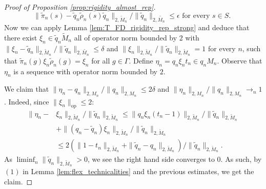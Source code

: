 \documentclass[11pt]{amsart}
\DeclareMathOperator{\op}{op}
\theoremstyle{definition}
\theoremstyle{remark}
\theoremstyle{definition}
\begin{document}
\begin{proof}[Proof of Proposition \ref{prop:rigidity_almost_rep}]
    $$\|\tilde\pi_n(s) -\tilde q_n\tilde \rho_n(s) \tilde q_n\|_{2,\widetilde{M}_n} / \| \tilde q_n\|_{2, \widetilde{M_n} } \leq \epsilon \text{ for every $s \in S$. }$$
    Now we can apply Lemma \ref{lem:T_FD_rigidity_rep_strong} and deduce that there exist $\xi_n \in \tilde q_n \widetilde M_n$ all of operator norm bounded by $2$ with $\| \xi_n - \tilde q_n \|_{2, \widetilde M_n} / \| \tilde q_n \|_{2,\widetilde{M_n}} \leq \delta$ and $\| \xi_n \|_{2,\widetilde{M}_n} / \| \tilde q_n \|_{2,\widetilde{M}_n} = 1$ for every $n$, such that $\tilde \pi_n(g) \xi_n \tilde \rho_n(g) = \xi_n$ for all $g \in \Gamma$.
 Define $\eta_n = q_n \xi_n t_n \in q_n M_n$. Observe that $\eta_n$ is a sequence with operator norm bounded by $2$.

 We claim that $\| \eta_n - q_n \|_{2,M_n} / \| q_n \|_{2,M_n} \leq  2\delta$ and  $\| \eta_n \|_{2, M_n} / \| q_n \|_{2,M_n} \to_n 1$. Indeed, since $\| \xi_n \|_{\op} \leq 2$:
 \begin{align*}
     \| \eta_n - &\xi_n \|_{2, \widetilde{M}_n} / \| \tilde q_n \|_{2,\widetilde{M}_n} \leq \| q_n\xi_n (t_n - 1) \|_{2, \widetilde{M}_n} / \| \tilde q_n \|_{2,\widetilde{M}_n} \\
     &+ \| (q_n - \tilde q_n )\xi_n  \|_{2, \widetilde{M}_n} / \| \tilde q_n \|_{2,\widetilde{M}_n}\\
     &\leq 2(\| 1 - t_n \|_{2,\widetilde{M}_n} + \| \tilde q_n - q_n \|_{2, \widetilde{M}_n}) / \| \tilde q_n \|_{2, \widetilde{M}_n}.
 \end{align*}
 As $\liminf_n \|\widetilde{q}_n \|_{2, \widetilde{M}_n} > 0$, we see the right hand side converges to $0$. As such, by $(1)$ in Lemma \ref{lem:flex_technicalities} and the previous estimates, we get the claim.


\end{proof}
\end{document}
